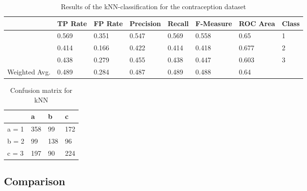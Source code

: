 \documentclass[paper=a4, fontsize=11pt]{scrartcl} %
\numberwithin{equation}{section} %
\numberwithin{figure}{section} %
\numberwithin{table}{section} %
\begin{document}
\begin{table}[h]
\centering
\begin{tabular}{|llllllll|}
	\hline
	&								TP Rate   	&FP Rate   &Precision   &Recall  &F-Measure   &ROC Area  	&Class\\
	\hline
									&0.569     	&0.351     &0.547     	&0.569   &0.558      	&0.65     	&1\\
                 	&0.414     	&0.166     &0.422     	&0.414   &0.418      	&0.677    	&2\\
                 	&0.438     	&0.279     &0.455     	&0.438   &0.447      	&0.603    	&3\\
  \hline
	Weighted Avg.   &0.489     	&0.284     &0.487     	&0.489   &0.488      	&0.64			&\\
	\hline
\end{tabular}
\caption{Results of the kNN-classification for the contraception dataset}
\end{table}

\vspace{6pt}

\begin{table}[h]
\centering
\begin{tabular}{|l|lll|}
	\hline
	      &a   &b   &c \\
	\hline
    a = 1 &358 &99  &172\\
    b = 2 &99  &138 &96 \\
 	c = 3 &197 &90  &224 \\
  \hline
\end{tabular}
\caption{Confusion matrix for kNN}
\end{table}


\subsection{Comparison}



\end{document}
